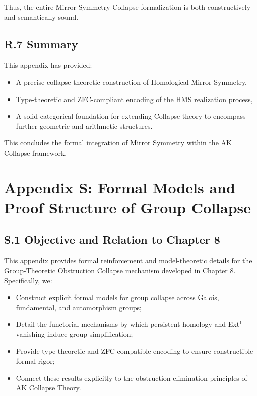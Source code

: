 \documentclass[11pt]{article}
\begin{document}
Thus, the entire Mirror Symmetry Collapse formalization is both constructively and semantically sound.

\subsection*{R.7 Summary}

This appendix has provided:

\begin{itemize}
  \item A precise collapse-theoretic construction of Homological Mirror Symmetry,
  \item Type-theoretic and ZFC-compliant encoding of the HMS realization process,
  \item A solid categorical foundation for extending Collapse theory to encompass further geometric and arithmetic structures.
\end{itemize}

This concludes the formal integration of Mirror Symmetry within the AK Collapse framework.




\section*{Appendix S: Formal Models and Proof Structure of Group Collapse}

\subsection*{S.1 Objective and Relation to Chapter 8}

This appendix provides formal reinforcement and model-theoretic details for the Group-Theoretic Obstruction Collapse mechanism developed in Chapter 8. Specifically, we:

\begin{itemize}
    \item Construct explicit formal models for group collapse across Galois, fundamental, and automorphism groups;
    \item Detail the functorial mechanisms by which persistent homology and Ext$^1$-vanishing induce group simplification;
    \item Provide type-theoretic and ZFC-compatible encoding to ensure constructible formal rigor;
    \item Connect these results explicitly to the obstruction-elimination principles of AK Collapse Theory.
\end{itemize}
\end{document}
